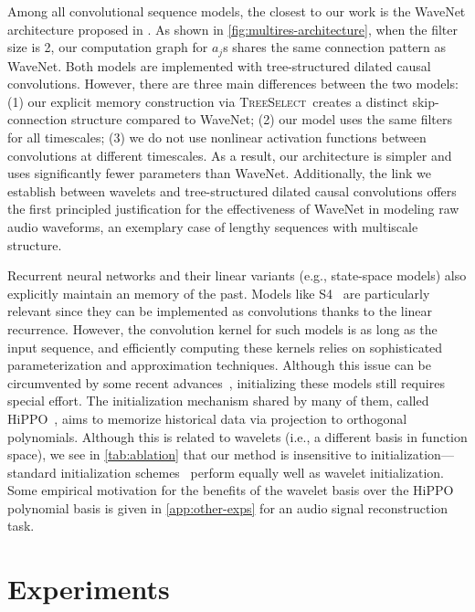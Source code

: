 \documentclass{article}
\theoremstyle{plain}
\theoremstyle{definition}
\theoremstyle{remark}
\newcommand{\treeselect}{\textsc{TreeSelect}}
\begin{document}
Among all convolutional sequence models, the closest to our work is the WaveNet architecture proposed in \citet{oord2016wavenet}. 
As shown in \cref{fig:multires-architecture}, when the filter size is 2, our computation graph for $a_j$s shares the same connection pattern as WaveNet. 
Both models are implemented with tree-structured dilated causal convolutions. 
However, there are three main differences between the two models: (1) our explicit memory construction via \treeselect\ creates a distinct skip-connection structure compared to WaveNet; (2) our model uses the same filters for all timescales; (3) we do not use nonlinear activation functions between convolutions at different timescales. 
As a result, our architecture is simpler and uses significantly fewer parameters than WaveNet. 
Additionally, the link we establish between wavelets and tree-structured dilated causal convolutions offers the first principled justification for the effectiveness of WaveNet in modeling raw audio waveforms, an exemplary case of lengthy sequences with multiscale structure. 

Recurrent neural networks and their linear variants (e.g., state-space models) also explicitly maintain an memory of the past.  
Models like S4~\citep{gu2021efficiently} are particularly relevant since they can be implemented as convolutions thanks to the linear recurrence. 
However, the convolution kernel for such models is as long as the input sequence, and efficiently computing these kernels relies on sophisticated parameterization and approximation techniques.
Although this issue can be circumvented by some recent advances~\citep{gupta2022diagonal,guparameterization,smith2022simplified}, initializing these models still requires special effort. 
The initialization mechanism shared by many of them, called HiPPO~\citep{gu2020hippo}, aims to memorize historical data via projection to orthogonal polynomials. 
Although this is related to  wavelets (i.e., a different basis in function space), we see in \cref{tab:ablation} that our method is insensitive to initialization---standard initialization schemes~\citep{glorot2010understanding} perform equally well as wavelet initialization. Some empirical motivation for the benefits of the wavelet basis over the HiPPO polynomial basis is given in \cref{app:other-exps} for an audio signal reconstruction task.





\section{Experiments}
\end{document}
